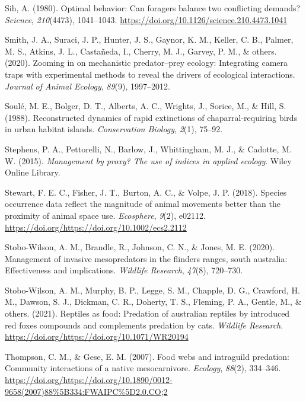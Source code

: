 \documentclass[]{elsarticle} %
\begin{document}
\leavevmode\hypertarget{ref-SIH1041}{}%
Sih, A. (1980). Optimal behavior: Can foragers balance two conflicting demands? \emph{Science}, \emph{210}(4473), 1041--1043. \url{https://doi.org/10.1126/science.210.4473.1041}

\leavevmode\hypertarget{ref-smith2020}{}%
Smith, J. A., Suraci, J. P., Hunter, J. S., Gaynor, K. M., Keller, C. B., Palmer, M. S., Atkins, J. L., Castañeda, I., Cherry, M. J., Garvey, P. M., \& others. (2020). Zooming in on mechanistic predator--prey ecology: Integrating camera traps with experimental methods to reveal the drivers of ecological interactions. \emph{Journal of Animal Ecology}, \emph{89}(9), 1997--2012.

\leavevmode\hypertarget{ref-soule1988}{}%
Soulé, M. E., Bolger, D. T., Alberts, A. C., Wrights, J., Sorice, M., \& Hill, S. (1988). Reconstructed dynamics of rapid extinctions of chaparral-requiring birds in urban habitat islands. \emph{Conservation Biology}, \emph{2}(1), 75--92.

\leavevmode\hypertarget{ref-stephens2015}{}%
Stephens, P. A., Pettorelli, N., Barlow, J., Whittingham, M. J., \& Cadotte, M. W. (2015). \emph{Management by proxy? The use of indices in applied ecology}. Wiley Online Library.

\leavevmode\hypertarget{ref-stewart2018}{}%
Stewart, F. E. C., Fisher, J. T., Burton, A. C., \& Volpe, J. P. (2018). Species occurrence data reflect the magnitude of animal movements better than the proximity of animal space use. \emph{Ecosphere}, \emph{9}(2), e02112. \url{https://doi.org/https://doi.org/10.1002/ecs2.2112}

\leavevmode\hypertarget{ref-stobo2020management}{}%
Stobo-Wilson, A. M., Brandle, R., Johnson, C. N., \& Jones, M. E. (2020). Management of invasive mesopredators in the flinders ranges, south australia: Effectiveness and implications. \emph{Wildlife Research}, \emph{47}(8), 720--730.

\leavevmode\hypertarget{ref-stobo2021reptiles}{}%
Stobo-Wilson, A. M., Murphy, B. P., Legge, S. M., Chapple, D. G., Crawford, H. M., Dawson, S. J., Dickman, C. R., Doherty, T. S., Fleming, P. A., Gentle, M., \& others. (2021). Reptiles as food: Predation of australian reptiles by introduced red foxes compounds and complements predation by cats. \emph{Wildlife Research}. \url{https://doi.org/https://doi.org/10.1071/WR20194}

\leavevmode\hypertarget{ref-thompson2007food}{}%
Thompson, C. M., \& Gese, E. M. (2007). Food webs and intraguild predation: Community interactions of a native mesocarnivore. \emph{Ecology}, \emph{88}(2), 334--346. \url{https://doi.org/https://doi.org/10.1890/0012-9658(2007)88\%5B334:FWAIPC\%5D2.0.CO;2}
\end{document}
